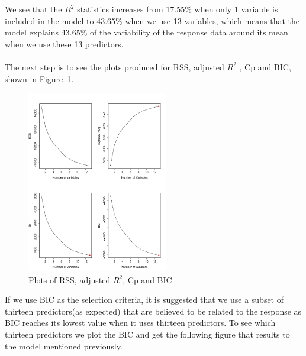 \documentclass{article}
\begin{document}
\noindent We see that the $R^2$ statistics increases from 17.55\% when only 1 variable is included in the model to 43.65\% when we use 13 variables, which means that  the model explains 43.65\% of the variability of the response data around its mean when we use these 13 predictors.
\\\\
The next step is to see the plots produced for RSS, adjusted $R^2$ , Cp and BIC, shown in Figure~\ref{RSS}.
\begin{figure}[h]
    \centering
    \includegraphics[width = 0.55\textwidth]{RSS_ETC_PLOT.pdf}
    \caption{Plots of RSS, adjusted $R^2$, Cp and BIC} 
    \label{RSS}
\end{figure} 
If we use BIC as the selection criteria, it is suggested that we use a subset of thirteen predictors(as expected) that are believed to be related to the response as BIC reaches its lowest value when it uses thirteen predictors. To see which thirteen predictors we plot the BIC and get the following figure that results to the model mentioned previously.
\end{document}
